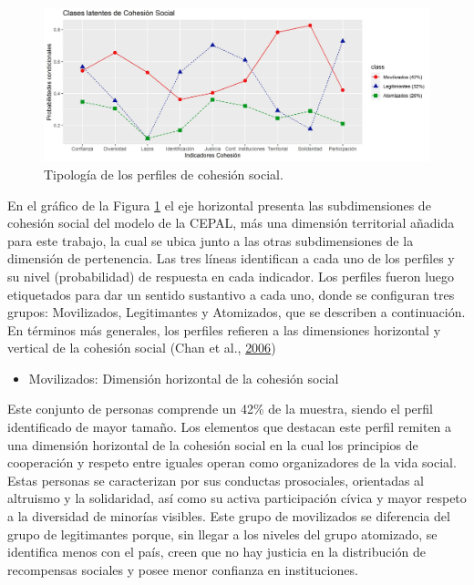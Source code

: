 \documentclass[
  12pt,
]{book}
\providecommand{\tightlist}{%
  \setlength{\itemsep}{0pt}\setlength{\parskip}{0pt}}
\begin{document}
\begin{figure}[H]

{\centering \includegraphics[width=1\linewidth,height=1\textheight]{output/graphs/lca3} 

}

\caption{Tipología de los perfiles de cohesión social.}\label{fig:clases-latentes}
\end{figure}

En el gráfico de la Figura \ref{fig:clases-latentes} el eje horizontal presenta las subdimensiones de cohesión social del modelo de la CEPAL, más una dimensión territorial añadida para este trabajo, la cual se ubica junto a las otras subdimensiones de la dimensión de pertenencia. Las tres líneas identifican a cada uno de los perfiles y su nivel (probabilidad) de respuesta en cada indicador. Los perfiles fueron luego etiquetados para dar un sentido sustantivo a cada uno, donde se configuran tres grupos: Movilizados, Legitimantes y Atomizados, que se describen a continuación. En términos más generales, los perfiles refieren a las dimensiones horizontal y vertical de la cohesión social (Chan et al., \protect\hyperlink{ref-chan_reconsidering_2006}{2006})

\begin{itemize}
\tightlist
\item
  Movilizados: Dimensión horizontal de la cohesión social
\end{itemize}

Este conjunto de personas comprende un 42\% de la muestra, siendo el perfil identificado de mayor tamaño. Los elementos que destacan este perfil remiten a una dimensión horizontal de la cohesión social en la cual los principios de cooperación y respeto entre iguales operan como organizadores de la vida social. Estas personas se caracterizan por sus conductas prosociales, orientadas al altruismo y la solidaridad, así como su activa participación cívica y mayor respeto a la diversidad de minorías visibles. Este grupo de movilizados se diferencia del grupo de legitimantes porque, sin llegar a los niveles del grupo atomizado, se identifica menos con el país, creen que no hay justicia en la distribución de recompensas sociales y posee menor confianza en instituciones.
\end{document}
